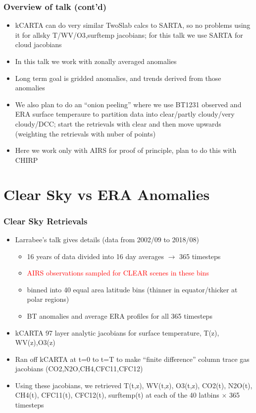 \documentclass[10pt,t]{beamer}
\begin{document}
\begin{frame}
  \frametitle{Overview of talk (cont'd)}
  \begin{itemize}
  \item kCARTA can do very similar TwoSlab calcs to SARTA, so no problems using it for allsky
        T/WV/O3,surftemp jacobians; for this talk we use SARTA for cloud jacobians
  \item In this talk we work with zonally averaged anomalies
  \item Long term goal is gridded anomalies, and trends derived from those anomalies
  \item We also plan to do an ``onion peeling'' where we use BT1231
    observed and ERA surface temperaure to partition data into
    clear/partly cloudy/very cloudy/DCC; start the retrievals with
    clear and then move upwards (weighting the retrievals with nuber
    of points)
  \item Here we work only with AIRS for proof of principle, plan to do this with CHIRP
  \end{itemize}
\end{frame}

\section{Clear Sky vs ERA Anomalies}
\begin{frame}
  \frametitle{Clear Sky Retrievals}
  \begin{itemize}
    \item Larrabee's talk gives details (data from 2002/09 to 2018/08)
      \begin{itemize}
        \item 16 years of data divided into 16 day averages $\rightarrow$ 365 timesteps
        \item \textcolor{red}{AIRS observations sampled for CLEAR scenes in these bins}
        \item binned into 40 equal area latitude bins (thinner in equator/thicker at polar regions)
        \item BT anomalies and average ERA profiles for all 365 timesteps
      \end{itemize}
    \item kCARTA 97 layer analytic jacobians for surface temperature, T(z), WV(z),O3(z)
    \item Ran off kCARTA at t=0 to t=T to make ``finite difference'' column trace gas jacobians
          (CO2,N2O,CH4,CFC11,CFC12)
    \item Using these jacobians, we retrieved T(t,z), WV(t,z), O3(t,z), CO2(t), N2O(t), CH4(t), 
          CFC11(t), CFC12(t), surftemp(t)
          at each of the 40 latbins $\times $ 365 timesteps
  \end{itemize}
\end{frame}
\end{document}
